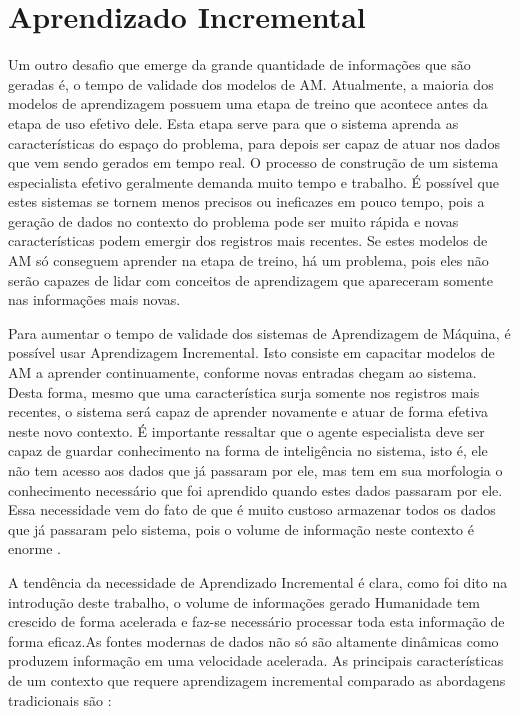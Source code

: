 \chapter{Aprendizado Incremental}


Um outro desafio que emerge da grande quantidade de informações que são geradas é, o tempo de validade dos modelos de AM. Atualmente, a maioria dos modelos de aprendizagem possuem uma etapa de treino que acontece antes da etapa de uso efetivo dele. Esta etapa serve para que o sistema aprenda as características do espaço do problema, para depois ser capaz de atuar nos dados que vem sendo gerados em tempo real. 
O processo de construção de um sistema especialista efetivo geralmente demanda muito tempo e trabalho. É possível que estes sistemas se tornem menos precisos ou ineficazes em pouco tempo, pois a geração de dados no contexto do problema pode ser muito rápida e novas características podem emergir dos registros mais recentes. Se estes modelos de AM só conseguem aprender na etapa de treino, há um problema, pois eles não serão capazes de lidar com conceitos de aprendizagem que apareceram somente nas informações mais novas. 

Para aumentar o tempo de validade dos sistemas de Aprendizagem de Máquina, é possível usar Aprendizagem Incremental. Isto consiste em capacitar modelos de AM a aprender continuamente, conforme novas entradas chegam ao sistema. Desta forma, mesmo que uma característica surja somente nos registros mais recentes, o sistema será capaz de aprender novamente e atuar de forma efetiva neste novo contexto. É importante ressaltar que o agente especialista deve ser capaz de guardar conhecimento na forma de inteligência no sistema, isto é, ele não tem acesso aos dados que já passaram por ele, mas tem em sua morfologia o conhecimento necessário que foi aprendido quando estes dados passaram por ele. Essa necessidade vem do fato de que é muito custoso armazenar todos os dados que já passaram pelo sistema, pois o volume de informação neste contexto é enorme \cite{incremental2011}.

A tendência da necessidade de Aprendizado Incremental é clara, como foi dito na introdução deste trabalho, o volume de informações gerado Humanidade tem crescido de forma acelerada e faz-se necessário processar toda esta informação de forma eficaz.As fontes modernas de dados não só são altamente dinâmicas como produzem informação em uma velocidade acelerada. As principais características de um contexto que requere aprendizagem incremental comparado as abordagens tradicionais são \cite{batch2013}:

